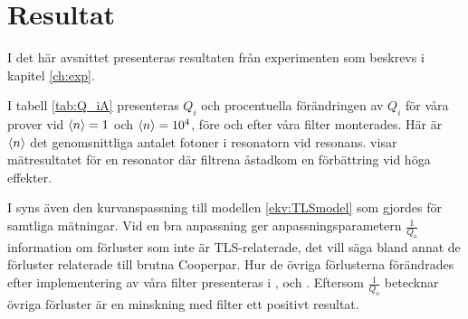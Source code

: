 \documentclass[main.tex]{subfiles}
\begin{document}
\chapter{Resultat}
\label{sec:results}
I det här avsnittet presenteras resultaten från experimenten som beskrevs i kapitel \ref{ch:exp}. 

I tabell \ref{tab:Q_iA} presenteras $Q_i$ och procentuella förändringen av $Q_i$ för våra prover vid $\expval{n}=1$  och $\expval{n}=10^4$, före och efter våra filter monterades. Här är $\expval{n}$ det genomsnittliga antalet fotoner i resonatorn vid resonans.  visar mätresultatet för en resonator där filtrena åstadkom en förbättring vid höga effekter. 

I  syns även den kurvanspassning till modellen \eqref{ekv:TLSmodel} som gjordes för samtliga mätningar. Vid en bra anpassning ger anpassningsparametern $\frac{1}{Q_o}$ information om förluster som inte är TLS-relaterade, det vill säga bland annat de förluster relaterade till brutna Cooperpar. Hur de övriga förlusterna förändrades efter implementering av våra filter presenteras i ,  och . Eftersom $\frac{1}{Q_o}$ betecknar övriga förluster är en minskning med filter ett positivt resultat. 




\end{document}
